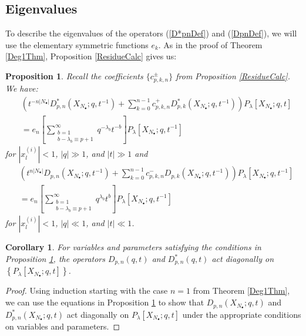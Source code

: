 \documentclass{amsart}
\newtheorem{prop}[thm]{Proposition}
\newtheorem{cor}[thm]{Corollary}
\theoremstyle{remark}
\numberwithin{thm}{section}
\numberwithin{equation}{section}
\begin{document}
\subsection{Eigenvalues}\label{Eigen}
To describe the eigenvalues of the operators (\ref{D*pnDef}) and (\ref{DpnDef}), we will use the elementary symmetric functions $ e_k$.
As in the proof of Theorem \ref{Deg1Thm}, Proposition \ref{ResidueCalc} gives us:
\begin{prop}\label{CombiEigen}
Recall the coefficients $\{c_{p,k,n}^\pm\}$ from Proposition \ref{ResidueCalc}.
We have:
\begin{equation}
\begin{aligned}
&\left(t^{-n|N_\bullet|}D_{p,n}^*(X_{N_\bullet}; q,t^{-1})+\sum_{k=0}^{n-1}c_{p,k,n}^+ D_{p,k}^*(X_{N_\bullet}; q,t^{-1}) \right)P_\lambda[X_{N_\bullet};q,t]\\
&= e_n\left[\sum_{\substack{b=1\\b-\lambda_b\equiv p+1}}^\infty q^{-\lambda_b}t^{-b}\right]P_\lambda[X_{N_\bullet};q,t^{-1}]
\end{aligned}
\label{EEigenEq}
\end{equation}
for $|x^{(i)}_{l}|<1$, $|q|\gg1$, and $|t|\gg 1$ and
\begin{equation}
\begin{aligned}
&\left(t^{n|N_\bullet|}D_{p,n}(X_{N_\bullet};q,t^{-1}) +\sum_{k=0}^{n-1}c_{p,k,n}^-D_{p,k}(X_{N_\bullet};q,t^{-1})\right)P_\lambda[X_{N_\bullet};q,t^{-1}]\\
&= e_n\left[\sum_{\substack{b=1\\b-\lambda_b\equiv p+1}}^\infty q^{\lambda_b} t^{b}\right]P_\lambda[X_{N_\bullet};q,t^{-1}]
\end{aligned}
\label{FEigenEq}
\end{equation}
for $|x^{(i)}_{l}|<1$, $|q|\ll1$, and $|t|\ll 1$.
\end{prop}

\begin{cor}
For variables and parameters satisfying the conditions in Proposition \ref{CombiEigen}, the operators $D_{p,n}(q,t)$ and $D_{p,n}^*(q,t)$ act diagonally on $\left\{ P_\lambda\left[ X_{N_\bullet};q,t \right] \right\}$.
\end{cor}

\begin{proof}
Using induction starting with the case $n=1$ from Theorem \ref{Deg1Thm}, we can use the equations in Proposition \ref{CombiEigen} to show that $D_{p,n}(X_{N_\bullet};q,t)$ and $D_{p,n}^*(X_{N_\bullet};q,t)$ act diagonally on $P_\lambda[X_{N_\bullet};q,t]$ under the appropriate conditions on variables and parameters.
\end{proof}
\end{document}

